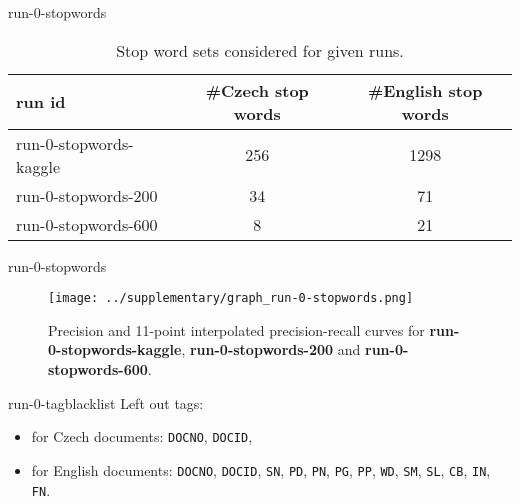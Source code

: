 \documentclass{beamer}
\newcommand{\Run}[1]{\textbf{#1}}
\let\Oldinput
\renewcommand{}[1]{\resizebox{\textwidth}{!}{\Oldinput{#1}}}
\begin{document}
\begin{frame}{run-0-stopwords}
\begin{table}[h]
    \centering
    \begin{tabular}{l | c c}
        run id & \#Czech stop words & \#English stop words \\
        \hline
        run-0-stopwords-kaggle & 256 & 1298\\
        run-0-stopwords-200 & 34 & 71\\
        run-0-stopwords-600 & 8 & 21\\
    \end{tabular}
    \caption{Stop word sets considered for given
    runs.\label{tbl:run-0-stopwords_sets}}
\end{table}
\end{frame}

\begin{frame}{run-0-stopwords}
\begin{table}[h]
\centering

    \caption{Results of \Run{run-0-stopwords-kaggle}, \Run{run-0-stopwords-200} and
    \Run{run-0-stopwords-600}.\label{tbl:run-0-stopwords}}
\end{table}

\begin{figure}[h]
\centering
\texttt{[image: ../supplementary/graph\_run-0-stopwords.png]}
    \caption{Precision and 11-point interpolated precision-recall curves for
    \Run{run-0-stopwords-kaggle}, \Run{run-0-stopwords-200} and
    \Run{run-0-stopwords-600}.\label{fig:run-0-stopwords}}
\end{figure}
\end{frame}

\begin{frame}{run-0-tagblacklist}
Left out tags:
\begin{itemize}
    \item for Czech documents: \texttt{DOCNO}, \texttt{DOCID},
    \item for English documents: \texttt{DOCNO}, \texttt{DOCID}, \texttt{SN},
        \texttt{PD}, \texttt{PN}, \texttt{PG}, \texttt{PP}, \texttt{WD},
        \texttt{SM}, \texttt{SL}, \texttt{CB}, \texttt{IN}, \texttt{FN}.
\end{itemize}
\end{frame}
\end{document}
